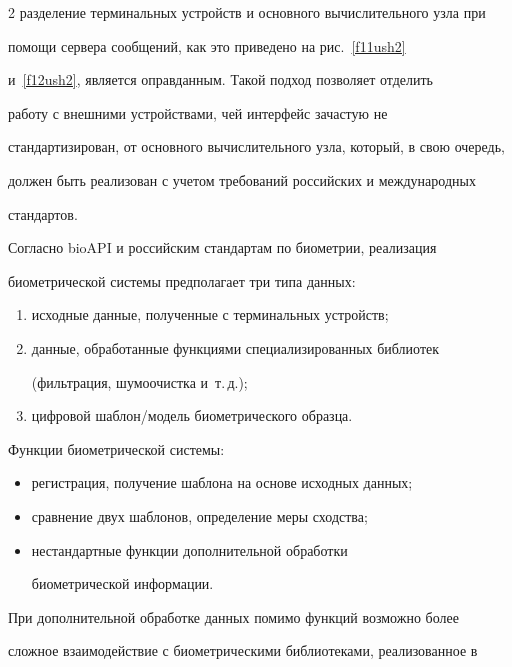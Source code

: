 \begin{multicols}{2}
разделение терминальных устройств и основного вычислительного узла при 

помощи сервера сообщений, как это приведено на рис.~\ref{f11ush2} 

и~\ref{f12ush2}, является оправданным. Такой подход позволяет отделить 

работу с внешними устройствами, чей интерфейс зачастую не

стандартизирован, от основного вычислительного узла, который, в свою очередь, 

должен быть реализован с учетом требований российских и международных 

стан\-дартов. 

  

  Согласно bioAPI и российским стандартам по биометрии, реализация 

биометрической системы предполагает три типа данных:

  \begin{enumerate}[(1)]

\item исходные данные, полученные с терминальных устройств;

\item данные, обработанные функциями специализированных библиотек 

(фильтрация, шумоочистка и~т.\,д.);

\item цифровой шаблон/модель биометрического образца.

\end{enumerate}

  Функции биометрической системы:

  \begin{itemize}

\item регистрация, получение шаблона на основе исходных данных;

\item сравнение двух шаблонов, определение меры сходства; 

\item нестандартные функции дополнительной обработки 

биометрической информации.

\end{itemize}



  При дополнительной обработке данных помимо функций возможно более 

сложное взаимодействие с биометрическими библиотеками, реализованное в 


\end{multicols}
